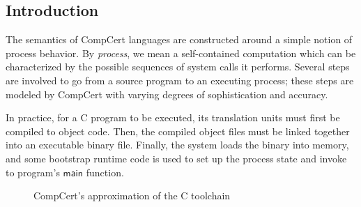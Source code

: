 \documentclass[sigplan,10pt,review,anonymous]{acmart}
\newcommand{\kw}[1]{\ensuremath{ \mathsf{#1} }}
\begin{document}
\subsection{Introduction} \label{sec:sem:intro} %

The semantics of CompCert languages
are constructed around a simple notion of process behavior.
By \emph{process}, we mean a self-contained computation
which can be characterized by
the possible sequences of system calls it performs.
Several steps are involved to go
from a source program to an executing process;
these steps are modeled by CompCert
with varying degrees of sophistication and accuracy.

In practice,
for a C program to be executed,
its translation units must first be compiled to object code.
Then,
the compiled object files must be linked together
into an executable binary file.
Finally, the system loads the binary into memory,
and some bootstrap runtime code
is used to set up the process state
and invoke to program's \kw{main} function.

\begin{figure} %
    \caption{CompCert's approximation of the C toolchain}
    \label{fig:process}
\end{figure}
\end{document}
